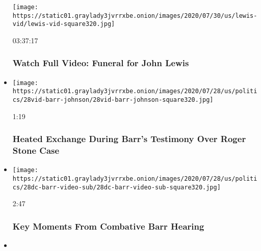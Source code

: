 \begin{itemize}
  \texttt{[image: https://static01.graylady3jvrrxbe.onion/images/2020/07/30/us/lewis-vid/lewis-vid-square320.jpg]}

  03:37:17

  \hypertarget{watch-full-video-funeral-for-john-lewis}{%
  \subsubsection{Watch Full Video: Funeral for John
  Lewis}\label{watch-full-video-funeral-for-john-lewis}}
\item
  \href{https://www.nytimes3xbfgragh.onion/video/us/politics/100000007261010/barr-johnson-roger-stone-trump.html?action=click\&module=video-series-bar\&region=header\&pgtype=Article\&playlistId=video/us-politics}{}

  \texttt{[image: https://static01.graylady3jvrrxbe.onion/images/2020/07/28/us/politics/28vid-barr-johnson/28vid-barr-johnson-square320.jpg]}

  1:19

  \hypertarget{heated-exchange-during-barrs-testimony-over-roger-stone-case}{%
  \subsubsection{Heated Exchange During Barr's Testimony Over Roger
  Stone
  Case}\label{heated-exchange-during-barrs-testimony-over-roger-stone-case}}
\item
  \href{https://www.nytimes3xbfgragh.onion/video/us/politics/100000007260259/barr-testifies-house-judiciary.html?action=click\&module=video-series-bar\&region=header\&pgtype=Article\&playlistId=video/us-politics}{}

  \texttt{[image: https://static01.graylady3jvrrxbe.onion/images/2020/07/28/us/politics/28dc-barr-video-sub/28dc-barr-video-sub-square320.jpg]}

  2:47

  \hypertarget{key-moments-from-combative-barr-hearing}{%
  \subsubsection{Key Moments From Combative Barr
  Hearing}\label{key-moments-from-combative-barr-hearing}}
\item
  \href{https://www.nytimes3xbfgragh.onion/video/us/100000007258794/trump-boasts-vaccine-progress-north-carolina.html?action=click\&module=video-series-bar\&region=header\&pgtype=Article\&playlistId=video/us-politics}{}


\end{itemize}
